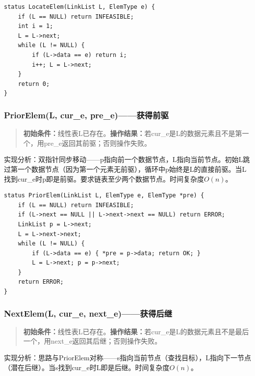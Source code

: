 \documentclass[supercite]{Experimental_Report}
\begin{document}
\begin{lstlisting}[label={lst:locate}, caption={LocateElem}]
status LocateElem(LinkList L, ElemType e) {
    if (L == NULL) return INFEASIBLE;
    int i = 1;
    L = L->next;
    while (L != NULL) {
        if (L->data == e) return i;
        i++; L = L->next;
    }
    return 0;
}
\end{lstlisting}

\subsubsection{PriorElem(L, cur\_e, pre\_e)——获得前驱}

\begin{quote}\small
\textbf{初始条件：}线性表L已存在。\quad\textbf{操作结果：}若cur\_e是L的数据元素且不是第一个，用pre\_e返回其前驱；否则操作失败。
\end{quote}

实现分析：双指针同步移动——p指向前一个数据节点，L指向当前节点。初始L跳过第一个数据节点（因为第一个元素无前驱），循环中p始终是L的直接前驱。当L找到cur\_e时p即是前驱。要求链表至少两个数据节点。时间复杂度$O(n)$。

\begin{lstlisting}[label={lst:prior}, caption={PriorElem}]
status PriorElem(LinkList L, ElemType e, ElemType *pre) {
    if (L == NULL) return INFEASIBLE;
    if (L->next == NULL || L->next->next == NULL) return ERROR;
    LinkList p = L->next;
    L = L->next->next;
    while (L != NULL) {
        if (L->data == e) { *pre = p->data; return OK; }
        L = L->next; p = p->next;
    }
    return ERROR;
}
\end{lstlisting}

\subsubsection{NextElem(L, cur\_e, next\_e)——获得后继}

\begin{quote}\small
\textbf{初始条件：}线性表L已存在。\quad\textbf{操作结果：}若cur\_e是L的数据元素且不是最后一个，用next\_e返回其后继；否则操作失败。
\end{quote}

实现分析：思路与PriorElem对称——s指向当前节点（查找目标），L指向下一节点（潜在后继）。当s找到cur\_e时L即是后继。时间复杂度$O(n)$。
\end{document}
